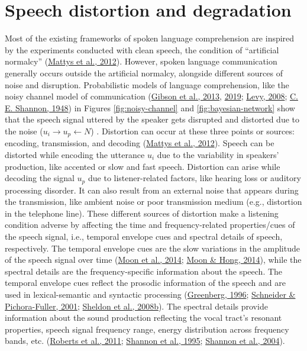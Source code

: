\documentclass[a4paper, nobind]{templates/ociamthesis}
\begin{document}
\hypertarget{distortion-degradation}{%
\section{Speech distortion and degradation}\label{distortion-degradation}}

Most of the existing frameworks of spoken language comprehension are inspired by the experiments conducted with clean speech,
the condition of ``artificial normalcy'' (\protect\hyperlink{ref-Mattys2012}{Mattys et al., 2012}).
However, spoken language communication generally occurs outside the artificial normalcy, alongside different sources of noise and disruption.
Probabilistic models of language comprehension, like the noisy channel model of communication (\protect\hyperlink{ref-Gibson2013}{Gibson et al., 2013}, \protect\hyperlink{ref-Gibson2019}{2019}; \protect\hyperlink{ref-Levy2008}{Levy, 2008}; \protect\hyperlink{ref-Shannon1948}{C. E. Shannon, 1948}) in Figures \ref{fig:noisy-channel} and \ref{fig:bayesian-network} show that the speech signal uttered by the speaker gets disrupted and distorted due to the noise (\(u_i\rightarrow u_p\leftarrow N\)) .
Distortion can occur at these three points or sources: encoding, transmission, and decoding (\protect\hyperlink{ref-Mattys2012}{Mattys et al., 2012}).
Speech can be distorted while encoding the utterance \(u_i\) due to the variability in speakers' production, like accented or slow and fast speech.
Distortion can arise while decoding the signal \(u_p\) due to listener-related factors, like hearing loss or auditory processing disorder.
It can also result from an external noise that appears during the transmission, like ambient noise or poor transmission medium (e.g., distortion in the telephone line).
These different sources of distortion make a listening condition adverse by affecting the time and frequency-related properties/cues of the speech signal, i.e., temporal envelope cues and spectral details of speech, respectively.
The temporal envelope cues are the slow variations in the amplitude of the speech signal over time (\protect\hyperlink{ref-Moon2014}{Moon et al., 2014}; \protect\hyperlink{ref-Moon2014a}{Moon \& Hong, 2014}), while the spectral details are the frequency-specific information about the speech.
The temporal envelope cues reflect the prosodic information of the speech and are used in lexical-semantic and syntactic processing (\protect\hyperlink{ref-Greenberg1996}{Greenberg, 1996}; \protect\hyperlink{ref-Schneider2001}{Schneider \& Pichora-Fuller, 2001}; \protect\hyperlink{ref-Sheldon2008b}{Sheldon et al., 2008b}).
The spectral details provide information about the sound production reflecting the vocal tract's resonant properties, speech signal frequency range, energy distribution across frequency bands, etc. (\protect\hyperlink{ref-Roberts2011}{Roberts et al., 2011}; \protect\hyperlink{ref-Shannon1995}{Shannon et al., 1995}; \protect\hyperlink{ref-Shannon2004}{Shannon et al., 2004}).
\end{document}
